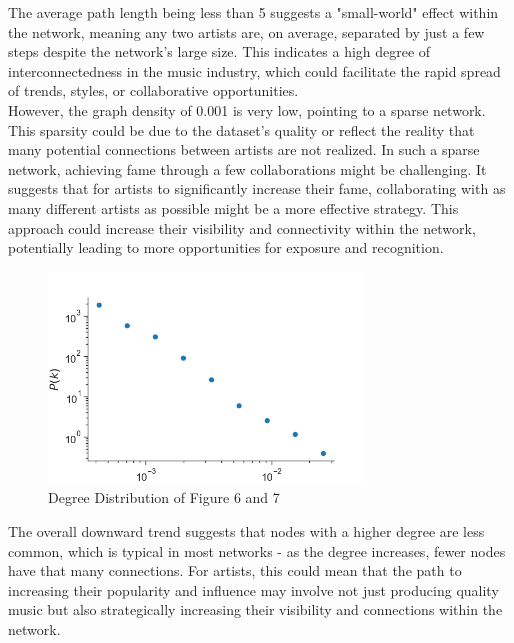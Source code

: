\documentclass[12pt,a4paper]{article}
\begin{document}
The average path length being less than 5 suggests a "small-world" effect within the network, meaning any two artists are, on average, separated by just a few steps despite the network's large size. This indicates a high degree of interconnectedness in the music industry, which could facilitate the rapid spread of trends, styles, or collaborative opportunities.\\

However, the graph density of 0.001 is very low, pointing to a sparse network. This sparsity could be due to the dataset's quality or reflect the reality that many potential connections between artists are not realized. In such a sparse network, achieving fame through a few collaborations might be challenging. It suggests that for artists to significantly increase their fame, collaborating with as many different artists as possible might be a more effective strategy. This approach could increase their visibility and connectivity within the network, potentially leading to more opportunities for exposure and recognition.
\begin{figure}[H]
  \centering
  \includegraphics[width=0.75\textwidth]{degreedist}
  \caption{Degree Distribution of Figure 6 and 7}
\end{figure}
The overall downward trend suggests that nodes with a higher degree are less common, which is typical in most networks - as the degree increases, fewer nodes have that many connections. For artists, this could mean that the path to increasing their popularity and influence may involve not just producing quality music but also strategically increasing their visibility and connections within the network.
\end{document}
